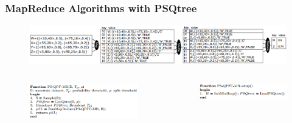 \documentclass{beamer}
\begin{document}
\begin{frame}
\frametitle{MapReduce Algorithms with PSQtree}
\begin{figure}[htpb]
  \begin{center}
	\includegraphics[width=\linewidth]{PS-QPFC-MR.png}
  \end{center}
\end{figure}

\begin{columns}[t] %
\begin{figure}[htpb]
  \begin{center}
	\includegraphics[width=\linewidth]{main.png}
  \end{center}
\end{figure}
\begin{figure}[htpb]
  \begin{center}
	\includegraphics[width=\linewidth]{setup.png}
  \end{center}
\end{figure}


\end{columns}
\end{frame}
\end{document}
